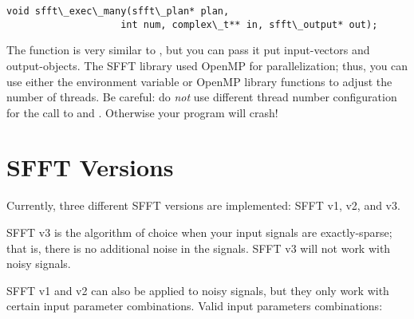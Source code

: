 \documentclass[letterpaper,10pt,english]{sphinxmanual}
\begin{document}
\begin{Verbatim}[commandchars=\\\{\}]
void sfft\_exec\_many(sfft\_plan* plan,
                    int num, complex\_t** in, sfft\_output* out);
\end{Verbatim}

The function is very similar to , but you can pass it put 
input-vectors and  output-objects. The SFFT library used OpenMP for
parallelization; thus, you can use either the environment variable
 or OpenMP library functions to adjust the number of
threads. Be careful: do \emph{not} use different thread number configuration for
the  call to  and . Otherwise your
program will crash!


\section{SFFT Versions}
\label{usage:sfft-versions}
Currently, three different SFFT versions are implemented: SFFT v1, v2, and v3.

SFFT v3 is the algorithm of choice when your input signals are exactly-sparse;
that is, there is no additional noise in the signals. SFFT v3 will not work
with noisy signals.

SFFT v1 and v2 can also be applied to noisy signals, but they only work with
certain input parameter combinations. Valid input parameters combinations:
\end{document}
